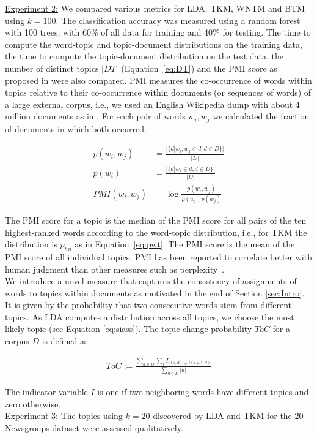 \documentclass[twocolumn,10]{article}
\newcommand{\ci}{~\cite} \newcommand{\re}{~\ref} \newcommand{\ma}{\mathbb}
\begin{document}
	\noindent\underline{Experiment 2:} We compared various metrics for LDA, TKM, WNTM and BTM using $k=100$. The classification accuracy was measured using a random forest with 100 trees, with 60\% of all data for training and 40\% for testing. The time to compute the word-topic and topic-document distributions on the training data, the time to compute the topic-document distribution on the test data, the number of distinct topics $|DT|$ (Equation\re{eq:DT}) and the PMI score as proposed in \cite{new10} were also compared. PMI measures the co-occurrence of words within topics relative to their co-occurrence within documents (or sequences of words) of a large external corpus, i.e., we used an English Wikipedia dump with about 4 million documents as in \cite{new10}. For each pair of words $w_i,w_j$ we calculated the fraction of documents in which both occurred. %
	\begin{small}
		\begin{equation} \begin{aligned}
		p(w_i,w_j) &=\frac{|\{d|w_i,w_j \in d, d \in D \}|}{|D|} \\%
		p(w_i) &= \frac{|\{d|w_i \in d, d \in D \}|}{|D|} \\%
		PMI(w_i,w_j) &= \log \frac{p(w_i,w_j)}{p(w_i) p(w_j)}  \label{eq:PMI}
		\end{aligned}   \end{equation} 
	\end{small}
	The PMI score for a topic is the median of the PMI score for all pairs of the ten highest-ranked words according to the word-topic distribution, i.e., for TKM the distribution is $p_{hu}$ as in Equation\re{eq:pwt}. The PMI score is the mean of the PMI score of all individual topics. PMI has been reported to correlate better with human judgment than other measures such as perplexity\ci{new10}.\\  
	We introduce a novel measure that captures the consistency of assignments of words to topics within documents as motivated in the end of Section \ref{sec:Intro}. It is given by the probability that two consecutive words stem from different topics. As LDA computes a distribution across all topics, we choose the most likely topic (see Equation \ref{eq:siass}). The topic change probability $ToC$ for a corpus $D$ is defined as
	
	\begin{small}
		\begin{equation} \begin{aligned}
		ToC:=\frac{\sum_{d \in D} \sum_i I_{t(i,d)\neq t(i+1,d)}}{\sum_{d \in D} |d|}  \label{eq:ToC}
		\end{aligned}   \end{equation} 
	\end{small}
	\noindent 
	The indicator variable $I$ is one if two neighboring words have different topics and zero otherwise.\smallskip\\
	\noindent\underline{Experiment 3:} The topics using $k=20$ discovered by LDA and TKM for the 20 Newsgroups dataset were assessed qualitatively.	
	
\end{document}
